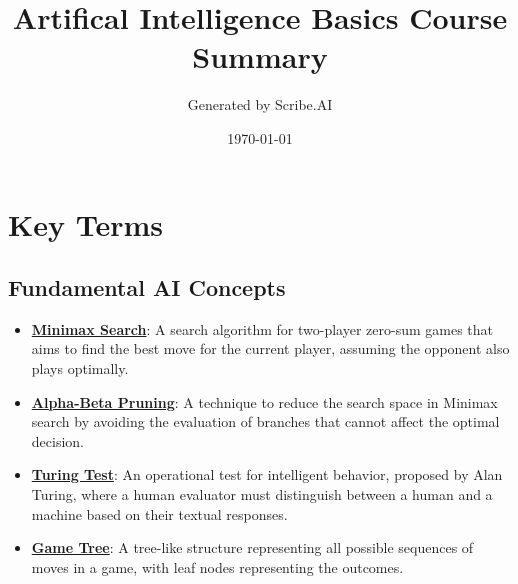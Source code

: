 \documentclass{article}%
\title{Artifical Intelligence Basics Course Summary}%
\author{Generated by Scribe.AI}%
\date{\today}%
\begin{document}
%
\normalsize%
\maketitle%
\section{Key Terms}%
\label{sec:KeyTerms}%
\subsection{Fundamental AI Concepts}%
\label{subsec:FundamentalAIConcepts}%
\begin{itemize}[leftmargin=*]%
\item \href{\url{https://purdue.brightspace.com/d2l/common/assets/pdfjs-d2l-dist/1.0.14-legacy/web/viewer.html?file=\%252Fcontent\%252Fenforced\%252F1095467-wl.202510.CS.24300.001\%252F02L2-Intro.pdf\%253Fou\%253D1095467\&lang=en-us\&container=d2l-fileviewer-rendered-pdf\&fullscreen=d2l-fileviewer-rendered-pdf-dialog\&height=667}#page=22}{\textbf{Minimax Search}}: A search algorithm for two-player zero-sum games that aims to find the best move for the current player, assuming the opponent also plays optimally.%
\item \href{\url{https://purdue.brightspace.com/d2l/common/assets/pdfjs-d2l-dist/1.0.14-legacy/web/viewer.html?file=\%252Fcontent\%252Fenforced\%252F1095467-wl.202510.CS.24300.001\%252F02L2-Intro.pdf\%253Fou\%253D1095467\&lang=en-us\&container=d2l-fileviewer-rendered-pdf\&fullscreen=d2l-fileviewer-rendered-pdf-dialog\&height=667}#page=23}{\textbf{Alpha-Beta Pruning}}: A technique to reduce the search space in Minimax search by avoiding the evaluation of branches that cannot affect the optimal decision.%
\item \href{\url{https://purdue.brightspace.com/d2l/common/assets/pdfjs-d2l-dist/1.0.14-legacy/web/viewer.html?file=\%252Fcontent\%252Fenforced\%252F1095467-wl.202510.CS.24300.001\%252F02L2-Intro.pdf\%253Fou\%253D1095467\&lang=en-us\&container=d2l-fileviewer-rendered-pdf\&fullscreen=d2l-fileviewer-rendered-pdf-dialog\&height=667}#page=6}{\textbf{Turing Test}}: An operational test for intelligent behavior, proposed by Alan Turing, where a human evaluator must distinguish between a human and a machine based on their textual responses.%
\item \href{\url{https://purdue.brightspace.com/d2l/common/assets/pdfjs-d2l-dist/1.0.14-legacy/web/viewer.html?file=\%252Fcontent\%252Fenforced\%252F1095467-wl.202510.CS.24300.001\%252F02L2-Intro.pdf\%253Fou\%253D1095467\&lang=en-us\&container=d2l-fileviewer-rendered-pdf\&fullscreen=d2l-fileviewer-rendered-pdf-dialog\&height=667}#page=11}{\textbf{Game Tree}}: A tree-like structure representing all possible sequences of moves in a game, with leaf nodes representing the outcomes.%

\end{itemize}
\end{document}
